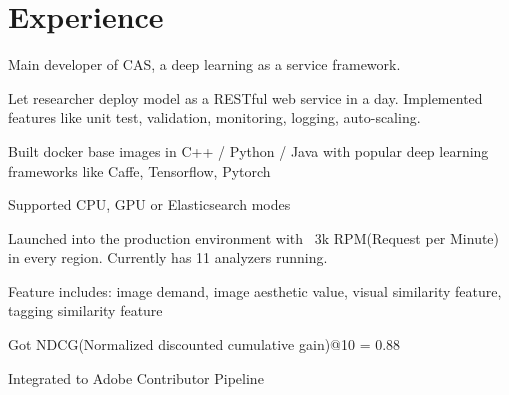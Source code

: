 \documentclass[letterpaper]{deedy-resume} %
\begin{document}
\hfill
%
%
\begin{minipage}[t]{0.66\textwidth} %


\section{Experience}


\sectionspace

\vspace{\topsep} %
\begin{tightitemize}
\item Main developer of CAS, a deep learning as a service framework. 
\item Let researcher deploy model as a RESTful web service in a day. Implemented features like unit test, validation, monitoring, logging, auto-scaling.
\item Built docker base images in C++ / Python / Java with popular deep learning frameworks like Caffe, Tensorflow, Pytorch
\item Supported CPU, GPU or Elasticsearch modes
\item Launched into the production environment with ~3k RPM(Request per Minute) in every region. Currently has 11 analyzers running.
\end{tightitemize}

\sectionspace

\begin{tightitemize}
\item Feature includes: image demand, image aesthetic value, visual similarity feature, tagging similarity feature
\item Got NDCG(Normalized discounted cumulative gain)@10 = 0.88
\item Integrated to Adobe Contributor Pipeline
\end{tightitemize}


\end{minipage}
\end{document}
